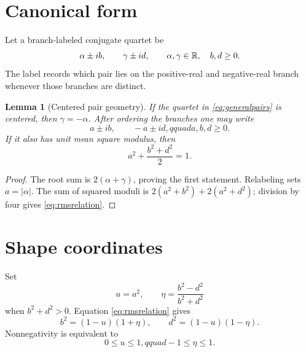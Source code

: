 \documentclass[12pt]{article}
\newtheorem{lemma}[theorem]{Lemma}\newtheorem{corollary}[theorem]{Corollary}
\theoremstyle{remark}\newtheorem{remark}[theorem]{Remark}
\begin{document}
\section{Canonical form}

Let a branch-labeled conjugate quartet be
\begin{equation}\label{eq:generalpairs}
 \alpha\pm i b,\qquad \gamma\pm i d,
 \qquad \alpha,\gamma\in\mathbb R,\quad b,d\ge0.
\end{equation}
The label records which pair lies on the positive-real and negative-real
branch whenever those branches are distinct.

\begin{lemma}[Centered pair geometry]\label{lem:center}
If the quartet in \eqref{eq:generalpairs} is centered, then
$\gamma=-\alpha$.  After ordering the branches one may write
\begin{equation}\label{eq:abd}
 a\pm ib,\qquad -a\pm id,qquad a,b,d\ge0.
\end{equation}
If it also has unit mean square modulus, then
\begin{equation}\label{eq:rmsrelation}
 a^2+\frac{b^2+d^2}{2}=1.
\end{equation}
\end{lemma}
\begin{proof}
The root sum is $2(\alpha+\gamma)$, proving the first statement.  Relabeling
sets $a=|\alpha|$.  The sum of squared moduli is
$2(a^2+b^2)+2(a^2+d^2)$; division by four gives
\eqref{eq:rmsrelation}.
\end{proof}

\section{Shape coordinates}

Set
\begin{equation}\label{eq:coordinates}
 u=a^2,
 \qquad
 \eta=\frac{b^2-d^2}{b^2+d^2}
\end{equation}
when $b^2+d^2>0$.  Equation \eqref{eq:rmsrelation} gives
\begin{equation}\label{eq:bd}
 b^2=(1-u)(1+\eta),\qquad
 d^2=(1-u)(1-\eta).
\end{equation}
Nonnegativity is equivalent to
\begin{equation}\label{eq:rectangle}
 0\le u\le1,qquad -1\le\eta\le1.
\end{equation}
\end{document}
